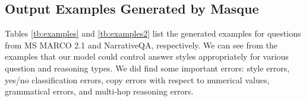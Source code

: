 \documentclass[11pt,a4paper]{article}
\theoremstyle{mydef}
\theoremstyle{myprob}
\begin{document}
\subsection{Output Examples Generated by Masque}

Tables \ref{tb:examples} and \ref{tb:examples2} list the 
generated examples for questions from MS MARCO 2.1 and NarrativeQA, respectively.  We can see from the examples that our model could control answer styles appropriately for various question and reasoning types.
We did find some important errors: 
style errors, yes/no classification errors, copy errors with respect to numerical values, grammatical errors, and multi-hop reasoning errors. 

\onecolumn
\label{sec:examples}
\end{document}
